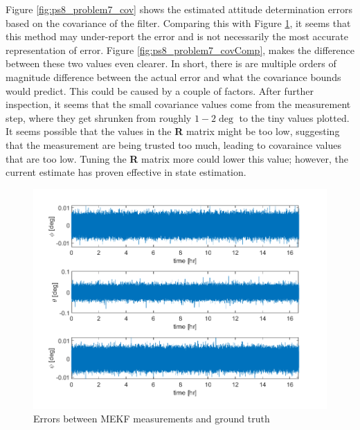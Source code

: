 Figure \ref{fig:ps8_problem7_cov} shows the estimated attitude determination errors based on the covariance of the filter. Comparing this with Figure \ref{fig:ps8_problem7_error}, it seems that this method may under-report the error and is not necessarily the most accurate representation of error. Figure \ref{fig:ps8_problem7_covComp}, makes the difference between these two values even clearer. In short, there is are multiple orders of magnitude difference between the actual error and what the covariance bounds would predict. This could be caused by a couple of factors. After further inspection, it seems that the small covariance values come from the measurement step, where they get shrunken from roughly $1-2 \deg$ to the tiny values plotted. It seems possible that the values in the \textbf{R} matrix might be too low, suggesting that the measurement are being trusted too much, leading to covaraince values that are too low. Tuning the \textbf{R} matrix more could lower this value; however, the current estimate has proven effective in state estimation.

\begin{figure}[H]
\centering
\includegraphics[scale=0.8]{Images/ps8_problem7_error.png}
\caption{Errors between MEKF measurements and ground truth}
\label{fig:ps8_problem7_error}
\end{figure}

